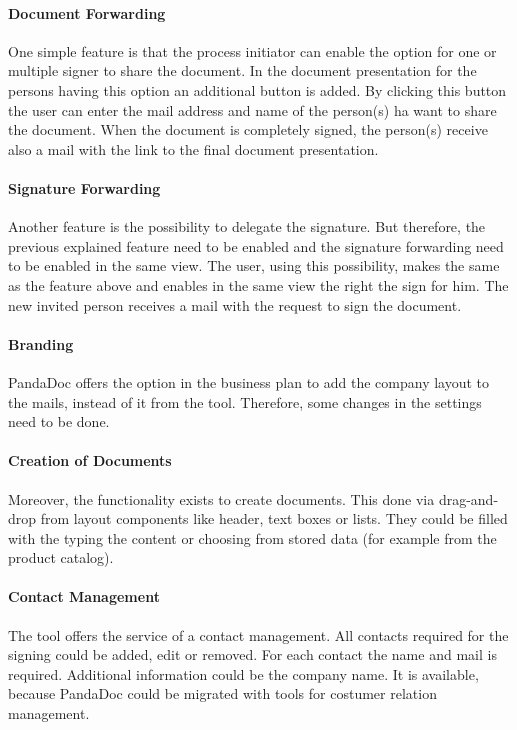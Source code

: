\paragraph{Document Forwarding}
One simple feature is that the process initiator can enable the option for one or multiple signer to share the document. In the document presentation for the persons having this option an additional button is added. By clicking this button the user can enter the mail address and name of the person(s) ha want to share the document. When the document is completely signed, the person(s) receive also a mail with the link to the final document presentation. 

\paragraph{Signature Forwarding}
Another feature is the possibility to delegate the signature. But therefore, the previous explained feature need to be enabled and the signature forwarding need to be enabled in the same view. The user, using this possibility, makes the same as the feature above and enables in the same view the right the sign for him. The new invited person receives a mail with the request to sign the document.

\paragraph{Branding}
PandaDoc offers the option in the business plan to add the company layout to the mails, instead of it from the tool. Therefore, some changes in the settings need to be done. 

\paragraph{Creation of Documents}
Moreover, the functionality exists to create documents. This done via drag-and-drop from layout components like header, text boxes or lists. They could be filled with the typing the content or choosing from stored data (for example from the product catalog).

\paragraph{Contact Management}
The tool offers the service of a contact management. All contacts required for the signing could be added, edit or removed. For each contact the name and mail is required. Additional information could be the company name. It is available, because PandaDoc could be migrated with tools for costumer relation management.

